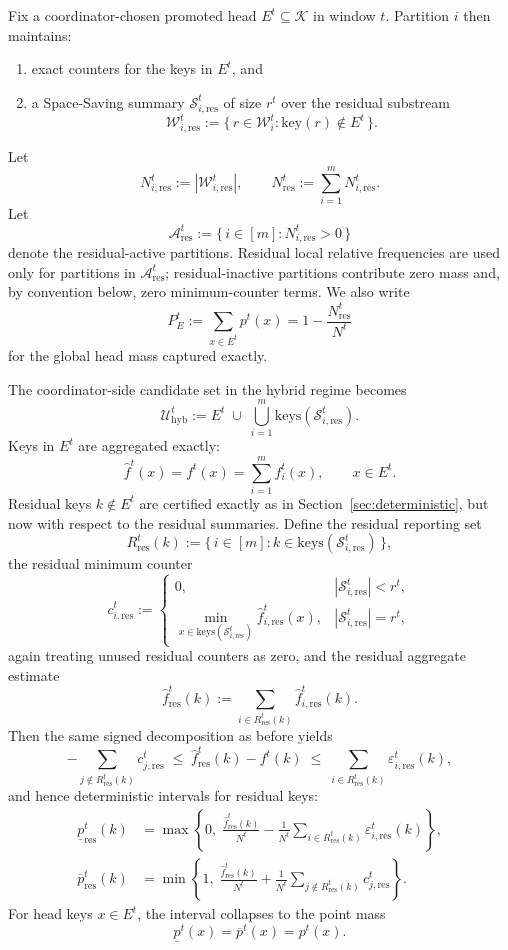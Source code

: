 \documentclass[sigconf, nonacm]{acmart}
\begin{document}
Fix a coordinator-chosen promoted head \(E^t \subseteq \mathcal{K}\) in window \(t\). Partition \(i\) then maintains:
\begin{enumerate}[leftmargin=*]
    \item exact counters for the keys in \(E^t\), and
    \item a Space-Saving summary \(\mathcal S_{i,\mathrm{res}}^t\) of size \(r^t\) over the residual substream
    \[
    \mathcal W_{i,\mathrm{res}}^t
    :=
    \{\, r \in \mathcal W_i^t : \mathrm{key}(r) \notin E^t \,\}.
    \]
\end{enumerate}
Let
\[
N_{i,\mathrm{res}}^t := |\mathcal W_{i,\mathrm{res}}^t|,
\qquad
N_{\mathrm{res}}^t := \sum_{i=1}^m N_{i,\mathrm{res}}^t.
\]
Let
\[
\mathcal A_{\mathrm{res}}^t
:=
\{\, i \in [m] : N_{i,\mathrm{res}}^t>0 \,\}
\]
denote the residual-active partitions. Residual local relative frequencies are used only for partitions in \(\mathcal A_{\mathrm{res}}^t\); residual-inactive partitions contribute zero mass and, by convention below, zero minimum-counter terms.
We also write
\[
P_E^t
:=
\sum_{x \in E^t} p^t(x)
=
1 - \frac{N_{\mathrm{res}}^t}{N^t}
\]
for the global head mass captured exactly.

The coordinator-side candidate set in the hybrid regime becomes
\[
\mathcal U_{\mathrm{hyb}}^t
:=
E^t
\;\cup\;
\bigcup_{i=1}^m \mathrm{keys}(\mathcal S_{i,\mathrm{res}}^t).
\]
Keys in \(E^t\) are aggregated exactly:
\[
\hat f^t(x)
=
f^t(x)
=
\sum_{i=1}^m f_i^t(x),
\qquad
x \in E^t.
\]
Residual keys \(k \notin E^t\) are certified exactly as in Section~\ref{sec:deterministic}, but now with respect to the residual summaries. Define the residual reporting set
\[
R_{\mathrm{res}}^t(k)
:=
\{\, i \in [m] : k \in \mathrm{keys}(\mathcal S_{i,\mathrm{res}}^t) \,\},
\]
the residual minimum counter
\[
c_{i,\mathrm{res}}^t
:=
\begin{cases}
0, & |\mathcal S_{i,\mathrm{res}}^t| < r^t,\\[0.75ex]
\min_{x \in \mathrm{keys}(\mathcal S_{i,\mathrm{res}}^t)}
\hat f_{i,\mathrm{res}}^t(x), & |\mathcal S_{i,\mathrm{res}}^t| = r^t,
\end{cases}
\]
again treating unused residual counters as zero, and the residual aggregate estimate
\[
\hat f_{\mathrm{res}}^t(k)
:=
\sum_{i \in R_{\mathrm{res}}^t(k)} \hat f_{i,\mathrm{res}}^t(k).
\]
Then the same signed decomposition as before yields
\[
-\sum_{j \notin R_{\mathrm{res}}^t(k)} c_{j,\mathrm{res}}^t
\;\le\;
\hat f_{\mathrm{res}}^t(k) - f^t(k)
\;\le\;
\sum_{i \in R_{\mathrm{res}}^t(k)} \varepsilon_{i,\mathrm{res}}^t(k),
\]
and hence deterministic intervals for residual keys:
\begin{align}
\underline p_{\mathrm{res}}^t(k)
&=
\max\!\left\{
0,\;
\frac{\hat f_{\mathrm{res}}^t(k)}{N^t}
-
\frac{1}{N^t}
\sum_{i \in R_{\mathrm{res}}^t(k)}
\varepsilon_{i,\mathrm{res}}^t(k)
\right\},
\\[0.75ex]
\overline p_{\mathrm{res}}^t(k)
&=
\min\!\left\{
1,\;
\frac{\hat f_{\mathrm{res}}^t(k)}{N^t}
+
\frac{1}{N^t}
\sum_{j \notin R_{\mathrm{res}}^t(k)}
c_{j,\mathrm{res}}^t
\right\}.
\end{align}
For head keys \(x \in E^t\), the interval collapses to the point mass
\[
\underline p^t(x)=\overline p^t(x)=p^t(x).
\]
\end{document}

